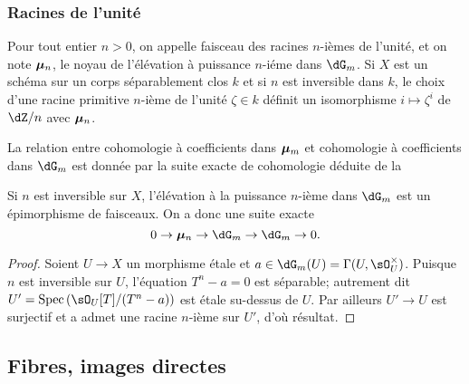 




\subsubsection{Racines de l'unité}\label{I:2-2-4}

Pour tout entier $n>0$, on appelle faisceau des racines $n$-ièmes de 
l'unité, et on note ${\bm\mu}_n$, le noyau de l'élévation à puissance 
$n$-iéme dans $\dG_m$. Si $X$ est un schéma sur un corps séparablement 
clos $k$ et si $n$ est inversible dans $k$, le choix d'une racine primitive 
$n$-ième de l'unité $\zeta\in k$ définit un isomorphisme 
$i\mapsto \zeta^i$ de $\dZ/n$ avec ${\bm\mu}_n$. 

La relation entre cohomologie à coefficients dans ${\bm\mu}_m$ et cohomologie à 
coefficients dans $\dG_m$ est donnée par la suite exacte de cohomologie déduite 
de la 






\begin{theorem}\label{I:2-2-5}
Si $n$ est inversible sur $X$, l'élévation à la puissance $n$-ième dans 
$\dG_m$ est un épimorphisme de faisceaux. On a donc une suite exacte 
\[
  0 \to \dmu_n \to \dG_m \to \dG_m \to 0\text{.}
\]
\end{theorem}
\begin{proof}
Soient $U\to X$ un morphisme étale et $a\in \dG_m(U) =\Gamma(U,\sO_U^\times)$. 
Puisque $n$ est inversible sur $U$, l'équation $T^n-a = 0$ est séparable; 
autrement dit $U'=\spec\left(\sO_U[T]/(T^n-a)\right)$ est étale su-dessus de 
$U$. Par ailleurs $U'\to U$ est surjectif et a admet une racine $n$-ième sur 
$U'$, d'où résultat. 
\end{proof}










\subsection{Fibres, images directes}\label{I:2-3}





\subsubsection{}\label{I:2-3-1}

